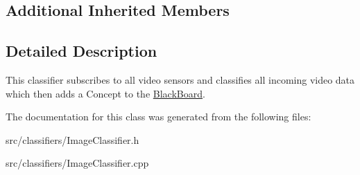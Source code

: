 \subsection*{Additional Inherited Members}


\subsection{Detailed Description}
This classifier subscribes to all video sensors and classifies all incoming video data which then adds a Concept to the \hyperlink{class_black_board}{Black\+Board}. 

The documentation for this class was generated from the following files\+:\begin{DoxyCompactItemize}
\item 
src/classifiers/Image\+Classifier.\+h\item 
src/classifiers/Image\+Classifier.\+cpp\end{DoxyCompactItemize}
